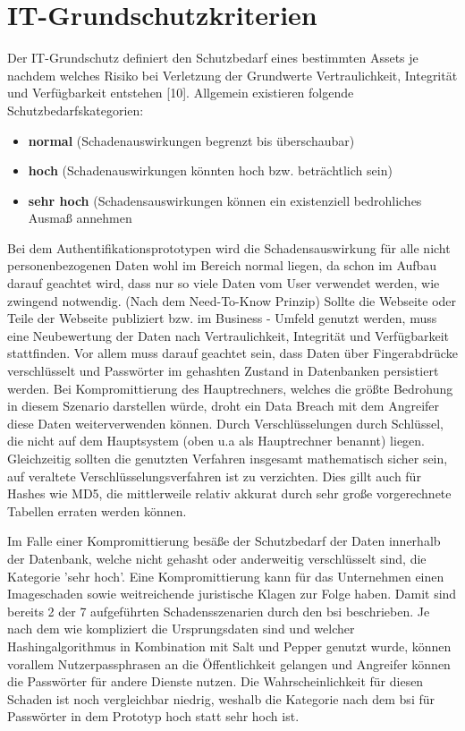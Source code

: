 \section{IT-Grundschutzkriterien}
Der IT-Grundschutz definiert den Schutzbedarf eines bestimmten Assets je nachdem welches Risiko bei Verletzung der Grundwerte Vertraulichkeit, Integrität und Verfügbarkeit entstehen [10]. Allgemein existieren folgende Schutzbedarfskategorien:
\begin{itemize} 
\item \textbf{normal} (Schadenauswirkungen begrenzt bis überschaubar)
\item \textbf{hoch} (Schadenauswirkungen könnten hoch bzw. beträchtlich sein)
\item \textbf{sehr hoch} (Schadensauswirkungen können ein existenziell bedrohliches Ausmaß annehmen
\end{itemize}
Bei dem Authentifikationsprototypen wird die Schadensauswirkung für alle nicht personenbezogenen Daten wohl im Bereich normal liegen, da schon im Aufbau darauf geachtet wird, dass nur so viele Daten vom User verwendet werden, wie zwingend notwendig. (Nach dem Need-To-Know Prinzip) Sollte die Webseite oder Teile der Webseite publiziert bzw. im Business - Umfeld genutzt werden, muss eine Neubewertung der Daten nach Vertraulichkeit, Integrität und Verfügbarkeit stattfinden. Vor allem muss darauf geachtet sein, dass Daten über Fingerabdrücke verschlüsselt und Passwörter im gehashten Zustand in Datenbanken persistiert werden. Bei Kompromittierung des Hauptrechners, welches die größte Bedrohung in diesem Szenario darstellen würde, droht ein Data Breach mit dem Angreifer diese Daten weiterverwenden können. Durch Verschlüsselungen durch Schlüssel, die nicht auf dem Hauptsystem (oben u.a als Hauptrechner benannt) liegen. Gleichzeitig sollten die genutzten Verfahren insgesamt mathematisch sicher sein, auf veraltete Verschlüsselungsverfahren ist zu verzichten. Dies gillt auch für Hashes wie MD5, die mittlerweile relativ akkurat durch sehr große vorgerechnete Tabellen erraten werden können.

Im Falle einer Kompromittierung besäße der Schutzbedarf der Daten innerhalb der Datenbank, welche nicht gehasht oder anderweitig verschlüsselt sind, die Kategorie 'sehr hoch'. Eine Kompromittierung kann für das Unternehmen einen Imageschaden sowie weitreichende juristische Klagen zur Folge haben. Damit sind bereits 2 der 7 aufgeführten Schadensszenarien durch den \ac{bsi} beschrieben. Je nach dem wie kompliziert die Ursprungsdaten sind und welcher Hashingalgorithmus in Kombination mit Salt und Pepper genutzt wurde, können vorallem Nutzerpassphrasen an die Öffentlichkeit gelangen und Angreifer können die Passwörter für andere Dienste nutzen. Die Wahrscheinlichkeit für diesen Schaden ist noch vergleichbar niedrig, weshalb die Kategorie nach dem \ac{bsi} für Passwörter in dem Prototyp hoch statt sehr hoch ist.
\newpage

